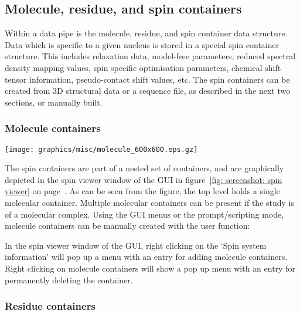 
\subsection{Molecule, residue, and spin containers}

Within a data pipe is the molecule, residue, and spin container data structure.  Data which is specific to a given nucleus is stored in a special spin container structure.  This includes relaxation data, model-free parameters, reduced spectral density mapping values, spin specific optimisation parameters, chemical shift tensor information, pseudo-contact shift values, etc.  The spin containers can be created from 3D structural data or a sequence file, as described in the next two sections, or manually built.



\subsubsection{Molecule containers}

\begin{figure*}[h]
\texttt{[image: graphics/misc/molecule\_600x600.eps.gz]}
\end{figure*}

The spin containers are part of a nested set of containers, and are graphically depicted in the spin viewer window of the GUI in figure~\ref{fig: screenshot: spin viewer} on page~\pageref{fig: screenshot: spin viewer}.  As can be seen from the figure, the top level holds a single molecular container.  Multiple molecular containers can be present if the study is of a molecular complex.  Using the GUI menus or the prompt/scripting mode, molecule containers can be manually created with the user function:


In the spin viewer window of the GUI, right clicking on the `Spin system information' will pop up a menu with an entry for adding molecule containers.  Right clicking on molecule containers will show a pop up menu with an entry for permanently deleting the container.



\subsubsection{Residue containers}

